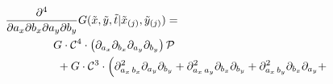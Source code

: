 \begin{align}
  \frac{\partial^4}{\partial a_x \partial b_x \partial a_y \partial b_y} G(\tilde{x},\tilde{y},\tilde{t} |  \tilde{x}_{(j)}, \tilde{y}_{(j)}) &= \\
  \MoveEqLeft[10] G \cdot \mathcal{C}^4 \cdot \left(\partial_{a_x}\partial_{b_x} \partial_{a_y}\partial_{b_y} \right)\mathcal{P}&  \nonumber \\
  \MoveEqLeft[10] \,\, + G \cdot \mathcal{C}^3 \cdot \left( \partial^2_{a_x\, b_x} \partial_{a_y} \partial_{b_y} + \partial^2_{a_x\, a_y} \partial_{b_x} \partial_{b_y} + \partial^2_{a_x\, b_y} \partial_{b_x} \partial_{a_y} + \right. &\nonumber \\

\end{align}
